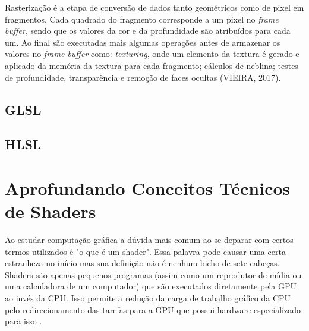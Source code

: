 Rasterização é a etapa de conversão de dados tanto geométricos como de pixel em fragmentos. Cada quadrado do fragmento corresponde a um pixel no \textit{frame buffer}, sendo que os valores da cor e da profundidade são atribuídos para cada um. Ao final são executadas mais algumas operações antes de armazenar os valores no \textit{frame buffer} como: \textit{texturing}, onde um elemento da textura é gerado e aplicado da memória da textura para cada fragmento; cálculos de neblina; testes de profundidade, transparência e remoção de faces ocultas (VIEIRA, 2017).

\subsection{GLSL}
\label{sec:glsl}

\subsection{HLSL}
\label{sec:hlsl}


\section{Aprofundando Conceitos Técnicos de Shaders}
\label{sec:aprofundando-conceitos-tecnicos-shaders}

Ao estudar computação gráfica a dúvida mais comum ao se deparar com certos termos utilizados é "o que é um shader". Essa palavra pode causar uma certa estranheza no início mas sua definição não é nenhum bicho de sete cabeças. Shaders são apenas pequenos programas (assim como um reprodutor de mídia ou uma calculadora de um computador) que são executados diretamente pela \acrshort{GPU} ao invés da \acrshort{CPU}. Isso permite a redução da carga de trabalho gráfico da \acrshort{CPU} pelo redirecionamento das tarefas para a \acrshort{GPU} que possui hardware especializado para isso \cite{openGLBook}.

	\begin{figure}[h!]
		\centering
	\end{figure}
	\nocite{figura5}

